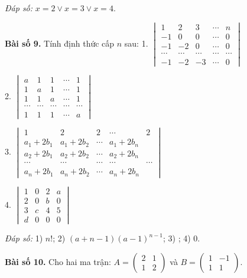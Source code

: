     \textit{Đáp số:} \(x = 2 \lor x = 3 \lor x = 4\).
    
    \textbf{Bài số 9.} Tính định thức cấp \(n\) sau:
    1. \(\begin{vmatrix}
    1 & 2 & 3 & \cdots & n \\
    -1 & 0 & 0 & \cdots & 0 \\
    -1 & -2 & 0 & \cdots & 0 \\
    \cdots & \cdots & \cdots & \cdots & \cdots \\
    -1 & -2 & -3 & \cdots & 0
    \end{vmatrix}\)
    
    2. \(\begin{vmatrix}
    a & 1 & 1 & \cdots & 1 \\
    1 & a & 1 & \cdots & 1 \\
    1 & 1 & a & \cdots & 1 \\
    \cdots & \cdots & \cdots & \cdots & \cdots \\
    1 & 1 & 1 & \cdots & a
    \end{vmatrix}\)
    \vspace*{0.5cm}

    3. \(\begin{vmatrix}
    1 & 2 & 2 & \cdots & 2 \\
    a_1 + 2b_1 & a_1 + 2b_2 & \cdots & a_1 + 2b_n \\
    a_2 + 2b_1 & a_2 + 2b_2 & \cdots & a_2 + 2b_n \\
    \cdots & \cdots & \cdots & \cdots & \cdots \\
    a_n + 2b_1 & a_n + 2b_2 & \cdots & a_n + 2b_n
    \end{vmatrix}\)
    \vspace*{0.5cm}

    4. \(\begin{vmatrix}
    1 & 0 & 2 & a \\
    2 & 0 & b & 0 \\
    3 & c & 4 & 5 \\
    d & 0 & 0 & 0
    \end{vmatrix}\)
    \vspace*{0.5cm}

    \textit{Đáp số:} 
    1) \(n!\);
    2) \((a + n - 1)(a - 1)^{n-1}\);
    3) ;
    4) \(0\).
    
    \textbf{Bài số 10.} Cho hai ma trận: \( A = \begin{pmatrix}
    2 & 1 \\
    1 & 2
    \end{pmatrix} \) và \( B = \begin{pmatrix}
    1 & -1 \\
    1 & 1
    \end{pmatrix} \).
    
